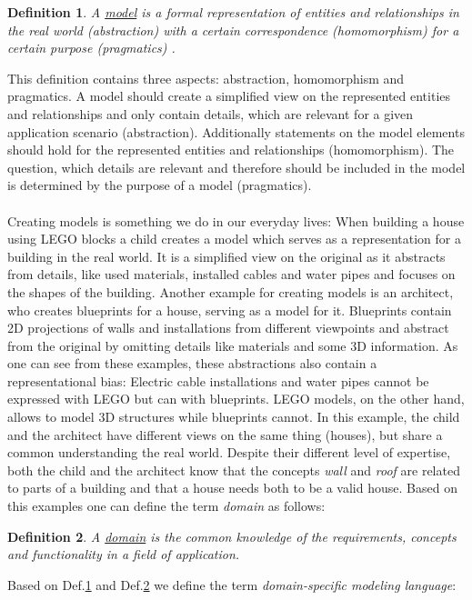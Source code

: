 \documentclass[runningheads,a4paper]{llncs}
\newtheorem{defn}{Definition}
\begin{document}
\begin{defn}
    \label{def:model}
    A \underline{model} is a formal representation of entities and relationships in the real world (abstraction) 
    with a certain correspondence (homomorphism) for a certain purpose (pragmatics) \cite{stachowiak1973allgemeine}.
\end{defn}
This definition contains three aspects: abstraction, homomorphism and pragmatics.
A model should create a simplified view on the represented entities and relationships and 
only contain details, which are relevant for a given application scenario (abstraction).
Additionally statements on the model elements should hold for the represented entities and relationships (homomorphism).
The question, which details are relevant and therefore should be included in the model is determined by the purpose of a model (pragmatics).  
\\\\
Creating models is something we do in our everyday lives:
When building a house using LEGO blocks a child creates a model which serves as a representation for a building in the real world.
It is a simplified view on the original as it abstracts from details, like used materials, installed cables and water pipes and focuses
on the shapes of the building. Another example for creating models is an architect, who creates blueprints for a house, serving as a model for it.
Blueprints contain 2D projections of walls and installations from different viewpoints and abstract from the original by omitting
details like materials and some 3D information. As one can see from these examples, these abstractions also contain a representational bias:
Electric cable installations and water pipes cannot be expressed with LEGO but can with blueprints.
LEGO models, on the other hand, allows to model 3D structures while blueprints cannot.
In this example, the child and the architect have different views on the same thing (houses), but share a common understanding the real world.
Despite their different level of expertise, both the child and the architect know that the concepts \textit{wall} and \textit{roof} 
are related to parts of a building and that a house needs both to be a valid house.
Based on this examples one can define the term \textit{domain} as follows:
\begin{defn}
\label{def:domain}
A \underline{domain} is the common knowledge of the requirements, concepts and functionality in a field of application.
\end{defn}
Based on Def.\ref{def:model} and Def.\ref{def:domain} we define the term \emph{domain-specific modeling language}:
\end{document}
